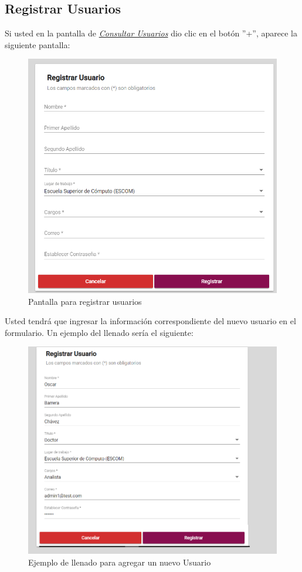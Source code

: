   \newpage
  \hypertarget{registrarUs}{}
  \subsection{Registrar Usuarios}
  Si usted  en la pantalla de \hyperlink{consultarUs}{\textit{Consultar Usuarios}} dio clic en el botón ''+'', aparece la siguiente pantalla:
  
  \begin{figure}[!hbtp]
  	\centering
  	\hypertarget{registrarUs}{\includegraphics[width=0.7\linewidth]{images/SP5/Registro-Usuario-vacio}}
  	\caption{Pantalla para registrar usuarios}
  	\label{registrarrh}
  \end{figure}
  
  Usted tendrá que ingresar la información correspondiente del nuevo usuario en el formulario. Un ejemplo del llenado  sería el siguiente:
  
  \begin{figure}[!hbtp]
  	\centering
  	\hypertarget{ejreg}{\includegraphics[width=0.7\linewidth]{images/SP5/Registro-Usuario-UA}}
  	\caption{Ejemplo de llenado para agregar un nuevo Usuario}
  	\label{ejreg}
  \end{figure}
  
